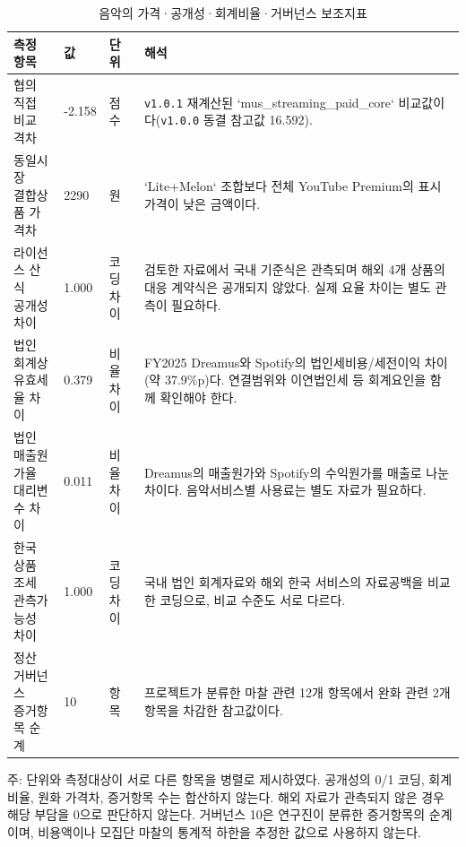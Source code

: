 \documentclass[11pt,a4paper]{report}
\newcommand{\WrapCell}[1]{\parbox[t]{\hsize}{\RaggedRight #1}}
\begin{document}
\begin{table}[H]
\centering
\caption{음악의 가격·공개성·회계비율·거버넌스 보조지표}
\label{tab:music_econ_effective_burden}
\footnotesize
\setlength{\tabcolsep}{3.5pt}
\begin{tabular}{L{3.5cm}L{1.5cm}L{1.8cm}L{7.0cm}}
\toprule
{}
측정 항목 & 값 & 단위 & 해석 \\
\midrule
협의 직접 비교 격차 & -2.158 & 점수 & \texttt{v1.0.1} 재계산된 `mus\_streaming\_paid\_core` 비교값이다(\texttt{v1.0.0} 동결 참고값 16.592). \\
\WrapCell{동일시장\\결합상품 가격차} & 2290 & 원 & `Lite+Melon` 조합보다 전체 YouTube Premium의 표시가격이 낮은 금액이다. \\
\WrapCell{라이선스 산식\\공개성 차이} & 1.000 & 코딩 차이 & 검토한 자료에서 국내 기준식은 관측되며 해외 4개 상품의 대응 계약식은 공개되지 않았다. 실제 요율 차이는 별도 관측이 필요하다. \\
\WrapCell{법인 회계상\\유효세율 차이} & 0.379 & 비율 차이 & FY2025 Dreamus와 Spotify의 법인세비용/세전이익 차이(약 37.9\%p)다. 연결범위와 이연법인세 등 회계요인을 함께 확인해야 한다. \\
\WrapCell{법인 매출원가율\\대리변수 차이} & 0.011 & 비율 차이 & Dreamus의 매출원가와 Spotify의 수익원가를 매출로 나눈 차이다. 음악서비스별 사용료는 별도 자료가 필요하다. \\
\WrapCell{한국 상품 조세\\관측가능성 차이} & 1.000 & 코딩 차이 & 국내 법인 회계자료와 해외 한국 서비스의 자료공백을 비교한 코딩으로, 비교 수준도 서로 다르다. \\
\WrapCell{정산 거버넌스\\증거항목 순계} & 10 & 항목 & 프로젝트가 분류한 마찰 관련 12개 항목에서 완화 관련 2개 항목을 차감한 참고값이다. \\
\bottomrule
\end{tabular}

\vspace{0.3em}
{\par\raggedright\footnotesize 주: 단위와 측정대상이 서로 다른 항목을 병렬로 제시하였다. 공개성의 0/1 코딩, 회계비율, 원화 가격차, 증거항목 수는 합산하지 않는다. 해외 자료가 관측되지 않은 경우 해당 부담을 0으로 판단하지 않는다. 거버넌스 10은 연구진이 분류한 증거항목의 순계이며, 비용액이나 모집단 마찰의 통계적 하한을 추정한 값으로 사용하지 않는다.\par}
\end{table}
\end{document}
